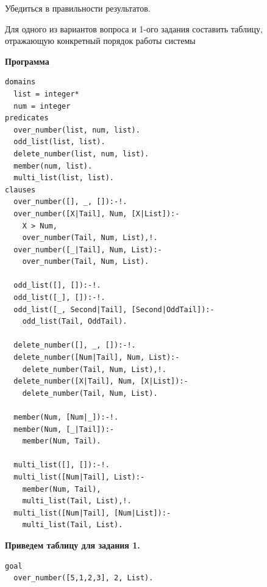 \documentclass[a4paper,14pt]{extreport} %
\begin{document}
Убедиться в правильности результатов. 

Для одного из вариантов вопроса и 1-ого задания  составить таблицу, отражающую конкретный порядок работы системы



\hfill

\textbf{Программа}

\begin{lstlisting}
domains
  list = integer*
  num = integer
predicates
  over_number(list, num, list).
  odd_list(list, list).
  delete_number(list, num, list).
  member(num, list).
  multi_list(list, list).
clauses    
  over_number([], _, []):-!.
  over_number([X|Tail], Num, [X|List]):-
    X > Num,
    over_number(Tail, Num, List),!.
  over_number([_|Tail], Num, List):-
    over_number(Tail, Num, List).
    
  odd_list([], []):-!.
  odd_list([_], []):-!.
  odd_list([_, Second|Tail], [Second|OddTail]):-
    odd_list(Tail, OddTail).
    
  delete_number([], _, []):-!.
  delete_number([Num|Tail], Num, List):-
    delete_number(Tail, Num, List),!.
  delete_number([X|Tail], Num, [X|List]):-
    delete_number(Tail, Num, List).
    
  member(Num, [Num|_]):-!.
  member(Num, [_|Tail]):-
    member(Num, Tail).

  multi_list([], []):-!.
  multi_list([Num|Tail], List):-
    member(Num, Tail),
    multi_list(Tail, List),!.
  multi_list([Num|Tail], [Num|List]):-
    multi_list(Tail, List).
\end{lstlisting}

\textbf{Приведем таблицу для задания 1. }
\begin{lstlisting}
goal
  over_number([5,1,2,3], 2, List).
\end{lstlisting}
\end{document}
